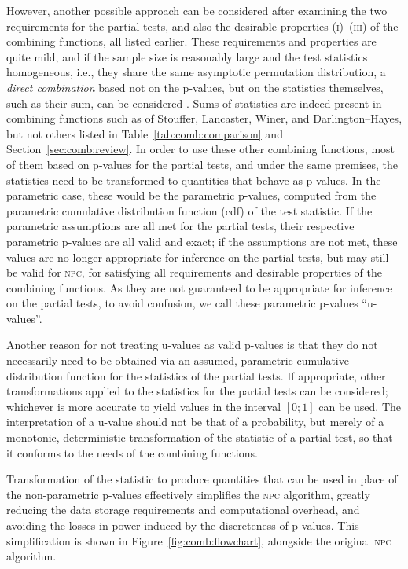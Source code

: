 However, another possible approach can be considered after examining the two requirements for the partial tests, and also the desirable properties (\textsc{i})--(\textsc{iii}) of the combining functions, all listed earlier. These requirements and properties are quite mild, and if the sample size is reasonably large and the test statistics homogeneous, i.e., they share the same asymptotic permutation distribution, a \emph{direct combination} based not on the p-values, but on the statistics themselves, such as their sum, can be considered \citep[page 131]{Pesarin2010}. Sums of statistics are indeed present in combining functions such as of Stouffer, Lancaster, Winer, and Darlington--Hayes, but not others listed in Table~\ref{tab:comb:comparison} and Section~\ref{sec:comb:review}. In order to use these other combining functions, most of them based on p-values for the partial tests, and under the same premises, the statistics need to be transformed to quantities that behave as p-values. In the parametric case, these would be the parametric p-values, computed from the parametric cumulative distribution function (cdf) of the test statistic. If the parametric assumptions are all met for the partial tests, their respective parametric p-values are all valid and exact; if the assumptions are not met, these values are no longer appropriate for inference on the partial tests, but may still be valid for \textsc{npc}, for satisfying all requirements and desirable properties of the combining functions. As they are not guaranteed to be appropriate for inference on the partial tests, to avoid confusion, we call these parametric p-values ``u-values''.

Another reason for not treating u-values as valid p-values is that they do not necessarily need to be obtained via an assumed, parametric cumulative distribution function for the statistics of the partial tests. If appropriate, other transformations applied to the statistics for the partial tests can be considered; whichever is more accurate to yield values in the interval $[0;1]$ can be used. The interpretation of a u-value should not be that of a probability, but merely of a monotonic, deterministic transformation of the statistic of a partial test, so that it conforms to the needs of the combining functions.

Transformation of the statistic to produce quantities that can be used in place of the non-parametric p-values effectively simplifies the \textsc{npc} algorithm, greatly reducing the data storage requirements and computational overhead, and avoiding the losses in power induced by the discreteness of p-values. This simplification is shown in Figure~\ref{fig:comb:flowchart}, alongside the original \textsc{npc} algorithm.

